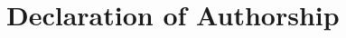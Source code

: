 \newpage
\thispagestyle{empty}

\section*{Declaration of Authorship}
\label{sec: Authorship}

%
% 
% 
%

